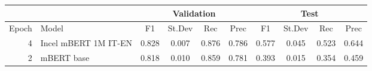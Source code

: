 \begin{tabular}{rl|cccc|cccc}
    \hline
                  &                    &  \multicolumn{4}{c|}{Validation}              & \multicolumn{4}{c}{Test} \\
    \hline
            Epoch &              Model &      F1 &      St.Dev &   Rec & Prec &       F1 &       St.Dev &  Rec   &  Prec \\
    \hline
      4 & Incel mBERT 1M IT-EN &   0.828 &          0.007 &    0.876 &     0.786 &    0.577 &           0.045 &     0.523 &      0.644 \\
      2 &           mBERT base &   0.818 &          0.010 &    0.859 &     0.781 &    0.393 &           0.015 &     0.354 &      0.459 \\
 \hline
\end{tabular}
